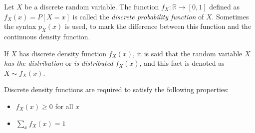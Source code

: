 \documentclass[12pt]{article}
\begin{document}

Let $X$ be a discrete random variable. The function $f_X\colon\mathbb{R} \to [0,1]$ defined as  $f_X(x)=P[X=x]$ is called the {\it discrete probability function} of $X$. Sometimes the syntax $p_X(x)$ is used, to mark the difference between this function and the continuous density function.

If $X$ has discrete density function $f_X(x)$, it is said that the random variable $X$ {\it has the distribution} or {\it is distributed} $f_X(x)$, and this fact is denoted as $X \sim f_X(x)$.

Discrete density functions are required to satisfy the following properties:
\begin{itemize}
\item $f_X(x) \geq 0$ for all $x$
\item $\sum_{x}f_X(x) = 1$
\end{itemize}
\end{document}
